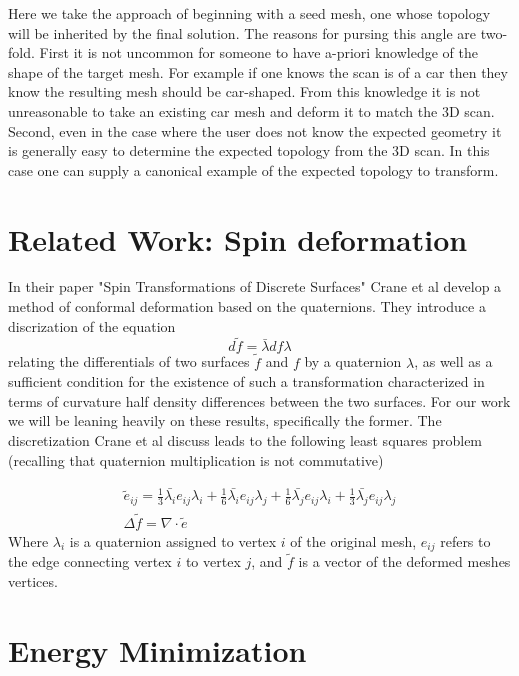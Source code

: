 \documentclass[sigconf]{acmart}
\begin{document}
Here we take the approach of beginning with a seed mesh, one whose topology will be inherited by the final solution. The reasons for pursing this angle are two-fold. First it is not uncommon for someone to have a-priori knowledge of the shape of the target mesh. For example if one knows the scan is of a car then they know the resulting mesh should be car-shaped. From this knowledge it is not unreasonable to take an existing car mesh and deform it to match the 3D scan. Second, even in the case where the user does not know the expected geometry it is generally easy to determine the expected topology from the 3D scan. In this case one can supply a canonical example of the expected topology to transform. 


\section{Related Work: Spin deformation}
In their paper "Spin Transformations of Discrete Surfaces" \cite{Crane:2011:STD} Crane et al develop a method of conformal deformation based on the quaternions. They introduce a discrization of the equation
\begin{equation}
\label{eqn:01}
d\tilde{f} = \bar{\lambda}df\lambda 
\end{equation}
relating the differentials of two surfaces $\tilde{f}$ and $f$ by a quaternion $\lambda$, as well as a sufficient condition for the existence of such a transformation characterized in terms of curvature half density differences between the two surfaces. For our work we will be leaning heavily on these results, specifically the former. The discretization Crane et al discuss leads to the following least squares problem (recalling that quaternion multiplication is not commutative)

\begin{align}
\label{eqn:02}
\tilde{e}_{ij} = \frac{1}{3}\bar{\lambda_{i}}e_{ij}\lambda_{i} + \frac{1}{6}\bar{\lambda_{i}}e_{ij}\lambda_{j} + \frac{1}{6}\bar{\lambda_{j}}e_{ij}\lambda_{i} + \frac{1}{3}\bar{\lambda_{j}}e_{ij}\lambda_{j} \\
\Delta \tilde{f} = \nabla \cdot \tilde{e}
\end{align}
Where $\lambda_{i}$ is a quaternion assigned to vertex $i$ of the original mesh, $e_{ij}$ refers to the edge connecting vertex $i$ to vertex $j$, and $\tilde{f}$ is a vector of the deformed meshes vertices.


\section{Energy Minimization}
\end{document}
